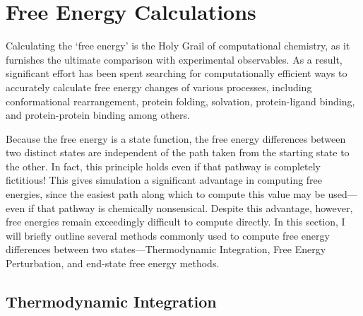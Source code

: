 \section{Free Energy Calculations}

Calculating the `free energy' is the Holy Grail of computational chemistry, as
it furnishes the ultimate comparison with experimental observables. As a result,
significant effort has been spent searching for computationally efficient ways
to accurately calculate free energy changes of various processes, including
conformational rearrangement, \cite{Vorobjev1998, Head1997} protein folding,
\cite{Yang1995a, Yang1995b, Portman1999} solvation, \cite{Eisenberg1986,
Jean-Charles1991} protein-ligand binding, \cite{Massova1999, Woo2005}
and protein-protein binding \cite{Gohlke2003, Gohlke2004} among others.

Because the free energy is a state function, the free energy differences between
two distinct states are independent of the path taken from the starting state to
the other. In fact, this principle holds even if that pathway is completely
fictitious! This gives simulation a significant advantage in computing free
energies, since the easiest path along which to compute this value may be
used---even if that pathway is chemically nonsensical. Despite this advantage,
however, free energies remain exceedingly difficult to compute directly.
\cite{Meirovitch_CurrOpinStructBiol_2007_v17_p181} In this section, I will
briefly outline several methods commonly used to compute free energy differences
between two states---Thermodynamic Integration, Free Energy Perturbation, and
end-state free energy methods.

\subsection{Thermodynamic Integration}
\label{sec2:ThermodynamicIntegration}

